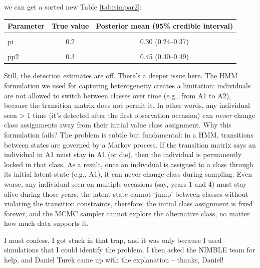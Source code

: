 \documentclass[
  12pt,
]{krantz}
\begin{document}
we can get a sorted new Table \ref{tab:simpar2}:

\begin{table}
\centering
\caption{\label{tab:simpar2}Comparison of posterior estimates from NIMBLE with the data-generating values for a finite--mixture HMM.}
\centering
\begin{longtable}{lcc}
\toprule
Parameter & True value & Posterior mean (95\% credible interval)\\
\midrule
\cellcolor{gray!10}{phi} & \cellcolor{gray!10}{0.7} & \cellcolor{gray!10}{0.70 (0.67–0.73)}\\
pi & 0.2 & 0.30 (0.24–0.37)\\
\cellcolor{gray!10}{pp1} & \cellcolor{gray!10}{0.8} & \cellcolor{gray!10}{0.49 (0.43–0.55)}\\
pp2 & 0.3 & 0.45 (0.40–0.49)\\
\bottomrule
\end{longtable}
\end{table}

\justifying

Still, the detection estimates are off. There's a deeper issue here. The HMM formulation we used for capturing heterogeneity creates a limitation: individuals are not allowed to switch between classes over time (e.g., from A1 to A2), because the transition matrix does not permit it. In other words, any individual seen \textgreater{} 1 time (it's detected after the first observation occasion) can \emph{never} change class assignments away from their initial value class assignment. Why this formulation fails? The problem is subtle but fundamental: in a HMM, transitions between states are governed by a Markov process. If the transition matrix says an individual in A1 must stay in A1 (or die), then the individual is permanently locked in that class. As a result, once an individual is assigned to a class through its initial latent state (e.g., A1), it can never change class during sampling. Even worse, any individual seen on multiple occasions (say, years 1 and 4) must stay alive during those years, the latent state cannot `jump' between classes without violating the transition constraints, therefore, the initial class assignment is fixed forever, and the MCMC sampler cannot explore the alternative class, no matter how much data supports it.

I must confess, I got stuck in that trap, and it was only because I used simulations that I could identify the problem. I then asked the NIMBLE team for help, and Daniel Turek came up with the explanation -- thanks, Daniel!
\end{document}
